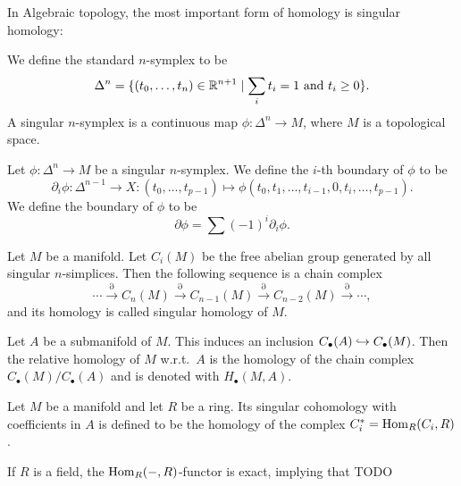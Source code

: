 In Algebraic topology, the most important form of homology is singular homology:

\begin{definition}
    We define the standard $n$-symplex to be \[\Delta^{n} = \{(t_0, \ldots, t_n) \in \mathbb{R}^{n+1}  \mid  \sum_i t_i = 1 \text{ and }  t_i \ge  0\}.\]
    A singular $n$-symplex is a continuous map $\phi: \Delta^{n} \to M$, where $M$ is a topological space. 
\end{definition}
\begin{definition}
    Let $\phi: \Delta^{n} \to  M$ be a singular $n$-symplex.
    We define the $i$-th boundary of $\phi$ to be
    \[
        \partial_i \phi: \Delta^{n-1} \to  X: (t_0, \ldots, t_{p-1}) \mapsto \phi(t_0, t_1, \ldots, t_{i-1}, 0, t_i, \ldots, t_{p-1})
    .\] 
    We define the boundary of $\phi$ to be
     \[
         \partial \phi = \sum (-1)^{i} \partial_i \phi
    .\] 
\end{definition}
\begin{definition}
    Let $M$ be a manifold.
    Let $C_i(M)$ be the free abelian group generated by all singular  $n$-simplices.
    Then the following sequence is a chain complex
    \[
        \cdots \xrightarrow{\partial} C_n(M) \xrightarrow{\partial}  C_{n-1}(M) \xrightarrow{\partial}  C_{n-2}(M) \xrightarrow{\partial}  \cdots
    ,\] 
    and its homology is called singular homology of $M$.
\end{definition}

\begin{definition}
    Let $A$ be a submanifold of $M$.
    This induces an inclusion  $C_{\bullet}(A) \hookrightarrow C_{\bullet}(M)$.
    Then the relative homology of $M$ w.r.t.\  $A$ is the homology of the chain complex  $C_\bullet(M) / C_\bullet(A)$ and is denoted with $H_{\bullet}(M, A)$.
\end{definition}

\begin{definition}
    Let $M$ be a manifold and let $R$ be a ring.
    Its singular cohomology with coefficients in $A$ is defined to be the homology of the complex $C_{i}^{*} = \operatorname{Hom}_R(C_i, R)$.
\end{definition}
\begin{remark}
    If $R$ is a field, the $\operatorname{Hom}_R(-, R)$-functor is exact, implying that TODO
\end{remark}


